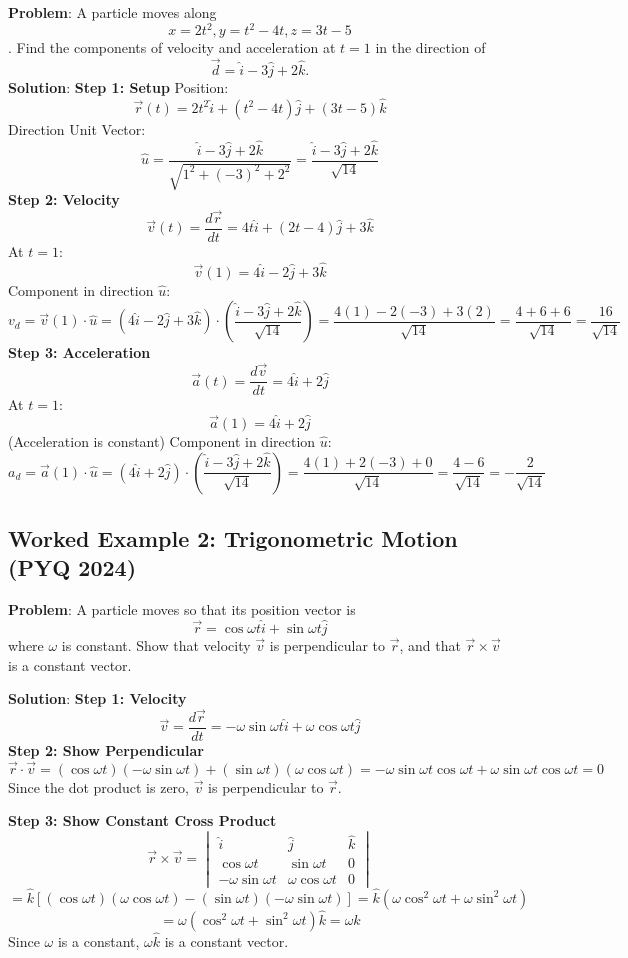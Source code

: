 \documentclass[
]{article}
\begin{document}
\textbf{Problem}: A particle moves along
\[
x = 2t^2, y = t^2 - 4t, z = 3t - 5
\]
. Find the components of velocity and acceleration at \(t=1\) in the
direction of
\[
\vec{d} = \hat{i} - 3\hat{j} + 2\hat{k}.
\]
\textbf{Solution}: \textbf{Step 1: Setup} Position:
\[
\vec{r}(t) = 2t^2\hat{i} + (t^2 - 4t)\hat{j} + (3t - 5)\hat{k}
\]
Direction Unit Vector:
\[
\hat{u} = \frac{\hat{i} - 3\hat{j} + 2\hat{k}}{\sqrt{1^2 + (-3)^2 + 2^2}} = \frac{\hat{i} - 3\hat{j} + 2\hat{k}}{\sqrt{14}}
\]
\textbf{Step 2: Velocity}
\[
\vec{v}(t) = \frac{d\vec{r}}{dt} = 4t\hat{i} + (2t - 4)\hat{j} + 3\hat{k}
\]
At \(t=1\):
\[
\vec{v}(1) = 4\hat{i} - 2\hat{j} + 3\hat{k}
\]
Component in direction \(\hat{u}\):
\[
v_d = \vec{v}(1) \cdot \hat{u} = (4\hat{i} - 2\hat{j} + 3\hat{k}) \cdot \left( \frac{\hat{i} - 3\hat{j} + 2\hat{k}}{\sqrt{14}} \right) = \frac{4(1) - 2(-3) + 3(2)}{\sqrt{14}} = \frac{4 + 6 + 6}{\sqrt{14}} = \frac{16}{\sqrt{14}}
\]
\textbf{Step 3: Acceleration}
\[
\vec{a}(t) = \frac{d\vec{v}}{dt} = 4\hat{i} + 2\hat{j}
\]
At \(t=1\):
\[
\vec{a}(1) = 4\hat{i} + 2\hat{j}
\]
(Acceleration is constant) Component in direction \(\hat{u}\):
\[
a_d = \vec{a}(1) \cdot \hat{u} = (4\hat{i} + 2\hat{j}) \cdot \left( \frac{\hat{i} - 3\hat{j} + 2\hat{k}}{\sqrt{14}} \right) = \frac{4(1) + 2(-3) + 0}{\sqrt{14}} = \frac{4 - 6}{\sqrt{14}} = -\frac{2}{\sqrt{14}}
\]

\subsection{Worked Example 2: Trigonometric Motion (PYQ
2024)}\label{worked-example-2-trigonometric-motion-pyq-2024}

\textbf{Problem}: A particle moves so that its position vector is
\[
\vec{r} = \cos \omega t \hat{i} + \sin \omega t \hat{j}
\]
where \(\omega\) is constant. Show that velocity \(\vec{v}\) is
perpendicular to \(\vec{r}\), and that \(\vec{r} \times \vec{v}\) is a
constant vector.

\textbf{Solution}: \textbf{Step 1: Velocity}
\[
\vec{v} = \frac{d\vec{r}}{dt} = -\omega \sin \omega t \hat{i} + \omega \cos \omega t \hat{j}
\]
\textbf{Step 2: Show Perpendicular}
\[
\vec{r} \cdot \vec{v} = (\cos \omega t)(-\omega \sin \omega t) + (\sin \omega t)(\omega \cos \omega t) = -\omega \sin \omega t \cos \omega t + \omega \sin \omega t \cos \omega t = 0
\]
Since the dot product is zero, \(\vec{v}\) is perpendicular to
\(\vec{r}\).

\textbf{Step 3: Show Constant Cross Product}
\[
\vec{r} \times \vec{v} =
\begin{vmatrix}
\hat{i} & \hat{j} & \hat{k} \\
\cos \omega t & \sin \omega t & 0 \\
-\omega \sin \omega t & \omega \cos \omega t & 0
\end{vmatrix}
\]
\[
= \hat{k} \left[ (\cos \omega t)(\omega \cos \omega t) - (\sin \omega t)(-\omega \sin \omega t) \right] = \hat{k}(\omega \cos^2 \omega t + \omega \sin^2 \omega t)
\]
\[
= \omega(\cos^2 \omega t + \sin^2 \omega t)\hat{k} = \omega\hat{k}
\]
Since \(\omega\) is a constant, \(\omega\hat{k}\) is a constant vector.
\end{document}
